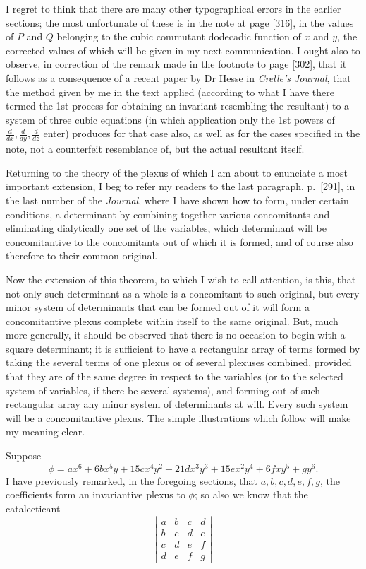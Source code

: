 \documentclass[11pt]{article}
\newcommand{\sourcepage}[1]{\marginpar{\scriptsize p.~#1}}
\begin{document}
\sourcepage{346}
I regret to think that there are many other typographical errors in the earlier sections; the most unfortunate of these is in the note at page [316], in the values of $P$ and $Q$ belonging to the cubic commutant dodecadic function of $x$ and $y$, the corrected values of which will be given in my next communication. I ought also to observe, in correction of the remark made in the footnote to page [302], that it follows as a consequence of a recent paper by Dr Hesse in \emph{Crelle's Journal}, that the method given by me in the text applied (according to what I have there termed the 1st process for obtaining an invariant resembling the resultant) to a system of three cubic equations (in which application only the 1st powers of $\frac{d}{dx},\frac{d}{dy},\frac{d}{dz}$ enter) produces for that case also, as well as for the cases specified in the note, not a counterfeit resemblance of, but the actual resultant itself.

Returning to the theory of the plexus of which I am about to enunciate a most important extension, I beg to refer my readers to the last paragraph, p.~[291], in the last number of the \emph{Journal}, where I have shown how to form, under certain conditions, a determinant by combining together various concomitants and eliminating dialytically one set of the variables, which determinant will be concomitantive to the concomitants out of which it is formed, and of course also therefore to their common original.

Now the extension of this theorem, to which I wish to call attention, is this, that not only such determinant as a whole is a concomitant to such original, but every minor system of determinants that can be formed out of it will form a concomitantive plexus complete within itself to the same original. But, much more generally, it should be observed that there is no occasion to begin with a square determinant; it is sufficient to have a rectangular array of terms formed by taking the several terms of one plexus or of several plexuses combined, provided that they are of the same degree in respect to the variables (or to the selected system of variables, if there be several systems), and forming out of such rectangular array any minor system of determinants at will. Every such system will be a concomitantive plexus. The simple illustrations which follow will make my meaning clear.

Suppose
\[
\phi=ax^6+6bx^5y+15cx^4y^2+21dx^3y^3+15ex^2y^4+6fxy^5+gy^6.
\]
I have previously remarked, in the foregoing sections, that $a,b,c,d,e,f,g$, the coefficients form an invariantive plexus to $\phi$; so also we know that the catalecticant
\[
\left|\begin{array}{cccc}
a&b&c&d\\
b&c&d&e\\
c&d&e&f\\
d&e&f&g
\end{array}\right|
\]
\end{document}
